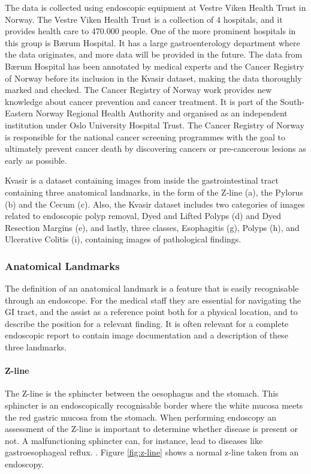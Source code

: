 The data is collected using endoscopic equipment at Vestre Viken Health Trust in Norway. The Vestre Viken Health Trust is a collection of 4 hospitals, and it provides health care to 470.000 people.
One of the more prominent hospitals in this group is Bærum Hospital. It has a large gastroenterology department where the data originates, and more data will be provided in the future. The data from Bærum Hospital has been annotated by medical experts and the Cancer Registry of Norway before its inclusion in the Kvasir dataset, making the data thoroughly marked and checked.
The Cancer Registry of Norway work provides new knowledge about cancer prevention and cancer treatment. It is part of the South-Eastern Norway Regional Health Authority and organised as an independent institution under Oslo University Hospital Trust. The Cancer Registry of Norway is responsible for the national cancer screening programmes with the goal to ultimately prevent cancer death by discovering cancers or pre-cancerous lesions as early as possible. 

\cite{runeMedico2018}

Kvasir is a dataset containing images from inside the gastrointestinal tract containing three anatomical landmarks, in the form of the Z-line (a), the Pylorus (b) and the Cecum (c). Also, the Kvasir dataset includes two categories of images related to endoscopic polyp removal, Dyed and Lifted Polyps (d) and Dyed Resection Margins (e), and lastly, three classes, Esophagitis (g), Polyps (h), and Ulcerative Colitis (i), containing images of pathological findings.


\subsubsection{Anatomical Landmarks}
The definition of an anatomical landmark is a feature that is easily recognisable through an endoscope. For the medical staff they are essential for navigating the GI tract, and the assist as a reference point both for a physical location, and to describe the position for a relevant finding.
It is often relevant for a complete endoscopic report to contain image documentation and a description of these three landmarks.
 
\paragraph{Z-line}
The Z-line is the sphincter between the oesophagus and the stomach. This sphincter is an endoscopically recognisable border where the white mucosa meets the red gastric mucosa from the stomach.  When performing endoscopy an assessment of the Z-line is important to determine whether disease is present or not. A malfunctioning sphincter can, for instance, lead to diseases like gastroesophageal reflux. .
Figure \ref{fig:z-line} shows a normal z-line taken from an endoscopy. 

